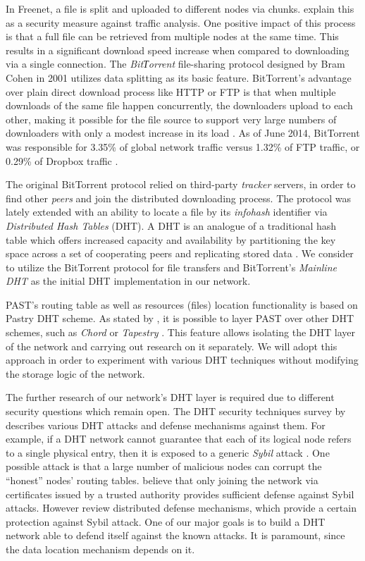 In Freenet, a file is split and uploaded to different nodes via chunks.
\citet{dark-freenet} explain this as a security measure against traffic
analysis. One positive impact of this process is that a full file can be retrieved from
multiple nodes at the same time. This results in a significant download
speed increase when compared to downloading via a single connection.
The \emph{BitТorrent} file-sharing protocol designed by Bram Cohen in 2001
\citep{bittorrent-specs} utilizes data splitting as its basic feature.
BitTorrent's advantage over plain direct download process like HTTP or FTP
is that when multiple downloads of the same file happen concurrently,
the downloaders upload to each other, making it possible for the file
source to support very large numbers of downloaders with only a modest
increase in its load \citep{bittorrent-specs}.
As of June 2014, BitTorrent was responsible for 3.35\% of global
network traffic versus 1.32\% of FTP traffic, or 0.29\% of
Dropbox traffic \citep{paloalto:traffic}.

The original BitTorrent protocol relied on third-party \emph{tracker}
servers, in order to find other \emph{peers} and
join the distributed downloading process.
The protocol was lately extended with an ability to locate a file by
its \emph{infohash} identifier via \emph{Distributed Hash Tables} (DHT).
A DHT is an analogue of a traditional hash table which offers increased
capacity and availability by partitioning the key space across a set
of cooperating peers and replicating stored data \cite{opendht}.
We consider to utilize the BitTorrent protocol for file transfers
and BitTorrent's \emph{Mainline DHT} \citep{bittorrent-dht} as the
initial DHT implementation in our network.

PAST's routing table as well as resources (files) location functionality
is based on Pastry \citep{pastry} DHT scheme. As stated by
\citet{past}, it is possible to layer PAST over other DHT schemes,
such as \emph{Chord} \citep{chord-01} or \emph{Tapestry} \citep{tapestry}.
This feature allows isolating the DHT layer of the network and
carrying out research on it separately. We will adopt this
approach in order to experiment with various DHT techniques without
modifying the storage logic of the network.

The further research of our network's DHT layer is required due to
different security questions which remain open.
The DHT security techniques survey by \citet{dht-security-survey}
describes various DHT attacks and defense mechanisms against them.
For example,
if a DHT network cannot guarantee that each of its logical node
refers to a single physical entry, then it is exposed to a
generic \emph{Sybil} attack \citep{sybil}. One possible
attack is that a large number of malicious nodes can corrupt the
``honest'' nodes' routing tables.
\citet{dht-security-survey} believe that only joining the network
via certificates issued by a trusted authority provides sufficient
defense against Sybil attacks. However \citet{dht-security-survey}
review distributed defense mechanisms, which provide a certain
protection against Sybil attack.
One of our major goals is to build a DHT network able to defend itself
against the known attacks. It is paramount, since the data location
mechanism depends on it.


